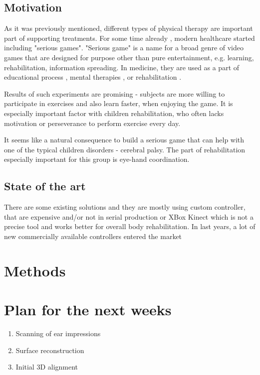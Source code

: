 \documentclass[10pt,a4paper]{article}
\begin{document}
\subsection*{Motivation}

As it was previously mentioned, different types of physical therapy are important part of supporting treatments. For some time already \cite{rehabilitation}, modern healthcare started including "serious games".  "Serious game" is a name for a broad genre of video games that are designed for purpose other than pure entertainment, e.g. learning, rehabilitation, information spreading. In medicine, they are used as a part of educational process \cite{exercise}, mental therapies \cite{mental_game, mental}, or rehabilitation \cite{physical_rehab, stroke_rehab}. 

Results of such experiments are promising - subjects are more willing to participate in exercises and also learn faster, when enjoying the game. It is especially important factor with children rehabilitation, who often lacks motivation or perseverance to perform exercise every day. 

It seems like a natural consequence to build a serious game that can help with one of the typical children disorders - cerebral palsy. The part of rehabilitation especially important for this group is eye-hand coordination.

\subsection*{State of the art}
There are some existing solutions and they are mostly using custom controller\cite{game_custom}, that are expensive and/or not in serial production or XBox Kinect \cite{game_xbox_360} which is not a precise tool and works better for overall body rehabilitation. In last years, a lot of new commercially available controllers entered the market 


\section*{Methods}


\section*{Plan for the next weeks}

\begin{enumerate}
\item Scanning of ear impressions
\item Surface reconstruction
\item Initial 3D alignment
\end{enumerate}


 

\end{document}
